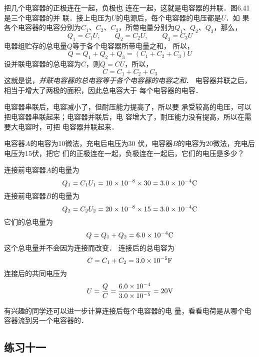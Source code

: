 把几个电容器的正极连在一起，负极也
连在一起，这就是电容器的并联．图6.41是三个电容器的并
联．接上电压为$U$的电源后，每个电容器的电压都是$U$．如
果各个电容器的电容分别为$C_1$、$C_2$、$C_3$，所带电量分别为$Q_1$、$Q_2$、$Q_3$，那么，
\[Q_1=C_1U,\qquad Q_2=C_2U,\qquad Q_3=C_3U\]
电器组贮存的总电量$Q$等于各个电容器所带电量之和，
所以，
\[Q=Q_1+Q_2+Q_3=(C_1+C_2+C_3)U\]
设并联电容器的总电容为$C$，则$Q=CU$，所以，
\[C=C_1+C_2+C_3\]
这就是说，\textit{并联电容器的总电容等于各个电容器的电容之和}．
电容器并联之后，相当于增大了两极的面积，因此总电容大于
每个电容器的电容．

电容器串联后，电容减小了，但耐压能力提高了，所以要
承受较高的电压，可以把电容器串联起来；电容器并联后，电
容增大了，耐压能力没有提高，所以在需要大电容时，可把
电容器并联起来．

\begin{example}
电容器$A$的电容为10微法，充电后电压为30
伏，电容器$B$的电容为20微法，充电后电压为15伏，把它
们的正极连在一起，负极连在一起后，它们的电压是多少？
\end{example}


\begin{solution}
连接前电容器$A$的电量为
\[Q_1=C_1U_1=10\times10^{-8}\times30=3.0\times10^{-4}{\rm C}\]
连接前电容器$B$的电量为
\[Q_2=C_2U_2=20\times10^{-8}\times 15=3.0\times10^{-4}{\rm C}\]
它们的总电量为
\[Q=Q_1+Q_2=6.0\times10^{-4}{\rm C}\]
这个总电量并不会因为连接而改变．
连接后的总电容为
\[C=C_1+C_2=3.0\times10^{-5}{\rm F}\]
连接后的共同电压为
\[U=\frac{Q}{C}=\frac{6.0\times10^{-4}}{3.0\times10^{-5}}=20{\rm V} \]
\end{solution}

有兴趣的同学还可以进一步计算连接后每个电容器的电
量，看看电荷是从哪个电容器流到另一个电容器的．

\subsection*{练习十一}

